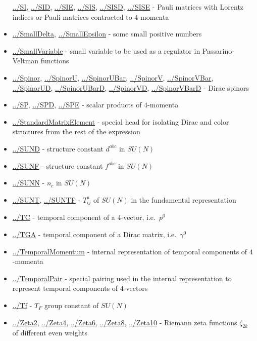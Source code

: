 \documentclass[../FeynCalcManual.tex]{subfiles}
\begin{document}
\begin{itemize}
  \hyperlink{../si}{../SI}, \hyperlink{../sid}{../SID},
  \hyperlink{../sie}{../SIE}, \hyperlink{../sis}{../SIS},
  \hyperlink{../sisd}{../SISD}, \hyperlink{../sise}{../SISE} - Pauli
  matrices with Lorentz indices or Pauli matrices contracted to
  \(4\)-momenta
\item
  \hyperlink{../smalldelta}{../SmallDelta},
  \hyperlink{../smallepsilon}{../SmallEpsilon} - some small positive
  numbers
\item
  \hyperlink{../smallvariable}{../SmallVariable} - small variable to be
  used as a regulator in Passarino-Veltman functions
\item
  \hyperlink{../spinor}{../Spinor}, \hyperlink{../spinoru}{../SpinorU},
  \hyperlink{../spinorubar}{../SpinorUBar},
  \hyperlink{../spinorv}{../SpinorV},
  \hyperlink{../spinorvbar}{../SpinorVBar},
  \hyperlink{../spinorud}{../SpinorUD},
  \hyperlink{../spinorubard}{../SpinorUBarD},
  \hyperlink{../spinorvd}{../SpinorVD},
  \hyperlink{../spinorvbard}{../SpinorVBarD} - Dirac spinors
\item
  \hyperlink{../sp}{../SP}, \hyperlink{../spd}{../SPD},
  \hyperlink{../spe}{../SPE} - scalar products of \(4\)-momenta
\item
  \hyperlink{../standardmatrixelement}{../StandardMatrixElement} -
  special head for isolating Dirac and color structures from the rest of
  the expression
\item
  \hyperlink{../sund}{../SUND} - structure constant \(d^{abc}\) in
  \(SU(N)\)
\item
  \hyperlink{../sunf}{../SUNF} - structure constant \(f^{abc}\) in
  \(SU(N)\)
\item
  \hyperlink{../sunn}{../SUNN} - \(n_c\) in \(SU(N)\)
\item
  \hyperlink{../sunt}{../SUNT}, \hyperlink{../suntf}{../SUNTF} -
  \(T^a_{ij}\) of \(SU(N)\) in the fundamental representation
\item
  \hyperlink{../tc}{../TC} - temporal component of a \(4\)-vector,
  i.e.~\(p^0\)
\item
  \hyperlink{../tga}{../TGA} - temporal component of a Dirac matrix,
  i.e.~\(\gamma^0\)
\item
  \hyperlink{../temporalmomentum}{../TemporalMomentum} - internal
  representation of temporal components of \(4\)-momenta
\item
  \hyperlink{../temporalpair}{../TemporalPair} - special pairing used in
  the internal representation to represent temporal components of
  \(4\)-vectors
\item
  \hyperlink{../tf}{../Tf} - \(T_F\) group constant of \(SU(N)\)
\item
  \hyperlink{../zeta2}{../Zeta2}, \hyperlink{../zeta4}{../Zeta4},
  \hyperlink{../zeta6}{../Zeta6}, \hyperlink{../zeta8}{../Zeta8},
  \hyperlink{../zeta10}{../Zeta10} - Riemann zeta functions
  \(\zeta_{2k}\) of different even weights
\end{itemize}
\end{document}
